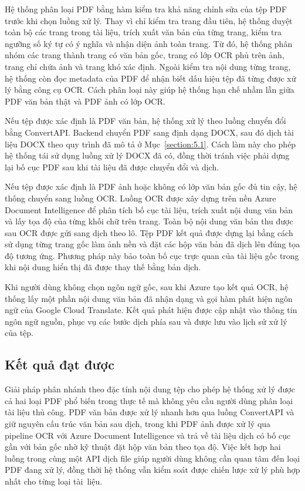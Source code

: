\documentclass[../DoAn.tex]{subfiles}
\begin{document}
Hệ thống phân loại PDF bằng hàm kiểm tra khả năng chỉnh sửa của tệp PDF trước khi chọn luồng xử lý. Thay vì chỉ kiểm tra trang đầu tiên, hệ thống duyệt toàn bộ các trang trong tài liệu, trích xuất văn bản của từng trang, kiểm tra ngưỡng số ký tự có ý nghĩa và nhận diện ảnh toàn trang. Từ đó, hệ thống phân nhóm các trang thành trang có văn bản gốc, trang có lớp OCR phủ trên ảnh, trang chỉ chứa ảnh và trang khó xác định. Ngoài kiểm tra nội dung từng trang, hệ thống còn đọc metadata của PDF để nhận biết dấu hiệu tệp đã từng được xử lý bằng công cụ OCR. Cách phân loại này giúp hệ thống hạn chế nhầm lẫn giữa PDF văn bản thật và PDF ảnh có lớp OCR.

Nếu tệp được xác định là PDF văn bản, hệ thống xử lý theo luồng chuyển đổi bằng ConvertAPI. Backend chuyển PDF sang định dạng DOCX, sau đó dịch tài liệu DOCX theo quy trình đã mô tả ở Mục~\ref{section:5.1}. Cách làm này cho phép hệ thống tái sử dụng luồng xử lý DOCX đã có, đồng thời tránh việc phải dựng lại bố cục PDF sau khi tài liệu đã được chuyển đổi và dịch.

Nếu tệp được xác định là PDF ảnh hoặc không có lớp văn bản gốc đủ tin cậy, hệ thống chuyển sang luồng OCR. Luồng OCR được xây dựng trên nền Azure Document Intelligence để phân tích bố cục tài liệu, trích xuất nội dung văn bản và lấy tọa độ của từng khối chữ trên trang. Toàn bộ nội dung văn bản thu được sau OCR được gửi sang dịch theo lô. Tệp PDF kết quả được dựng lại bằng cách sử dụng từng trang gốc làm ảnh nền và đặt các hộp văn bản đã dịch lên đúng tọa độ tương ứng. Phương pháp này bảo toàn bố cục trực quan của tài liệu gốc trong khi nội dung hiển thị đã được thay thế bằng bản dịch.

Khi người dùng không chọn ngôn ngữ gốc, sau khi Azure tạo kết quả OCR, hệ thống lấy một phần nội dung văn bản đã nhận dạng và gọi hàm phát hiện ngôn ngữ của Google Cloud Translate. Kết quả phát hiện được cập nhật vào thông tin ngôn ngữ nguồn, phục vụ các bước dịch phía sau và được lưu vào lịch sử xử lý của tệp.

\subsection{Kết quả đạt được}

Giải pháp phân nhánh theo đặc tính nội dung tệp cho phép hệ thống xử lý được cả hai loại PDF phổ biến trong thực tế mà không yêu cầu người dùng phân loại tài liệu thủ công. PDF văn bản được xử lý nhanh hơn qua luồng ConvertAPI và giữ nguyên cấu trúc văn bản sau dịch, trong khi PDF ảnh được xử lý qua pipeline OCR với Azure Document Intelligence và trả về tài liệu dịch có bố cục gần với bản gốc nhờ kỹ thuật đặt hộp văn bản theo tọa độ. Việc kết hợp hai luồng trong cùng một API dịch file giúp người dùng không cần quan tâm đến loại PDF đang xử lý, đồng thời hệ thống vẫn kiểm soát được chiến lược xử lý phù hợp nhất cho từng loại tài~liệu.
\end{document}
